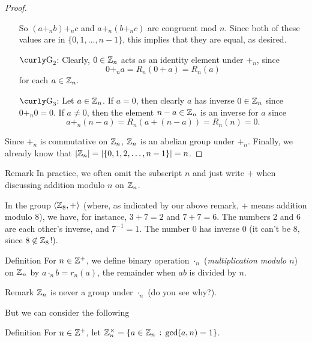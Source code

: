 \begin{example}{}
\begin{proof}
\begin{enumerate}
So $(a+_n b)+_n c$ and $a+_n (b+_n c)$ are congruent mod $n$.  Since
both of these values are in $\{0,1,\ldots, n-1\}$, this implies that
they are equal, as desired.
\item[$\G_2$:] Clearly, $0\in \mathbb{Z}_n$ acts as an identity element
    under $+_n$, since $$0+_n a =R_n(0+a)=R_n(a)$$ for each
    $a\in \mathbb{Z}_n$.
\item[$\G_3$:] Let $a\in \mathbb{Z}_n$.  If $a=0$, then clearly $a$ has
    inverse $0\in \mathbb{Z}_n$ since $0+_n 0 = 0$. If $a\neq 0$, then
    the element $n-a\in \mathbb{Z}_n$ is an inverse for $a$ since
    $$a+_n(n-a)=R_n(a+(n-a))=R_n(n)=0.$$
 \end{enumerate}

Since $+_n$ is commutative on $\mathbb{Z}_n$, $\mathbb{Z}_n$ is an abelian  group under $+_n$.  Finally, we already know that $|\mathbb{Z}_n|=|\{0,1,2,\ldots,n-1\}|=n$.\end{proof}
\end{example}

\begin{df}{Remark} In practice, we often omit the
subscript $n$ and just write $+$ when discussing addition
modulo $n$ on $\mathbb{Z}_n$.\end{df}



\begin{example}{} In the group $\langle\mathbb{Z}_8,+\rangle$ (where, as indicated by our above remark, $+$ means addition modulo $8$), we have, for instance, $3+7=2$ and $7+7=6$.
The numbers 2 and 6 are each other's inverse, and $7^{-1}=1$. The number $0$ has inverse $0$ (it can't be $8$, since $8\not\in \mathbb{Z}_8$!). \end{example}

\begin{df}{Definition} For $n\in \mathbb{Z}^+$,  we define binary operation $\cdot_n$ (\textit{multiplication modulo $n$}) on $\mathbb{Z}_n$ by $a\cdot_n b = r_n(a)$, the remainder when $ab$ is divided by $n$.\end{df}

\begin{df}{Remark} $\mathbb{Z}_n$ is never a group under $\cdot_n$ (do you see why?). \end{df}

But we can consider the following

\begin{df}{Definition} For $n\in \mathbb{Z}^+$,
let $\mathbb{Z}_n^{\times} = \{a\in \mathbb{Z}_n\,:\,\gcd(a,n)=1\}$.\end{df}

